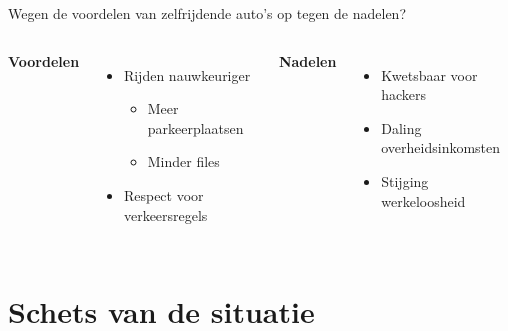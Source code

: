 \documentclass[aspectratio=169,kulak,t,handout]{kulakbeamer} %
\begin{document}
\begin{frame}{{\Large Wegen de voordelen van zelfrijdende auto's op tegen de nadelen?}}
	\begin{columns}
	\centering
	{\bf{Voordelen}}\\[.2cm]

		\begin{itemize}
			\large\item Rijden nauwkeuriger
			\begin{itemize}
				\normalsize\item Meer parkeerplaatsen
				\item Minder files
			\end{itemize}
			\item Respect voor verkeersregels
			
		\end{itemize}
	\centering
	{\bf{Nadelen}}\\[.2cm]

			\begin{itemize}
			\large\item Kwetsbaar voor hackers
			\item Daling overheidsinkomsten
			\item Stijging werkeloosheid
			\end{itemize}
	
	\end{columns}
\end{frame}

\begin{outlineframe}[Overzicht]
	\tableofcontents
\end{outlineframe}


\section{Schets van de situatie}
\end{document}
